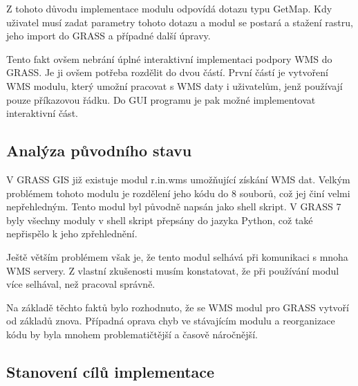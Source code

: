 \documentclass[a4paper,12pt]{article}
\begin{document}
Z tohoto důvodu implementace modulu odpovídá dotazu typu GetMap. Kdy
uživatel musí zadat parametry tohoto dotazu a modul se postará a
stažení rastru, jeho import do GRASS a případné další úpravy.


Tento fakt ovšem nebrání úplné interaktivní implementaci podpory WMS
do GRASS. Je ji ovšem potřeba rozdělit do dvou částí. První částí je
vytvoření WMS modulu, který umožní pracovat s WMS daty i uživatelům,
jenž používají pouze příkazovou řádku.  Do GUI programu je pak možné
implementovat interaktivní část.


\subsection{Analýza původního stavu}

V GRASS GIS již existuje modul r.in.wms umožňující získání WMS dat.
Velkým problémem tohoto modulu je rozdělení jeho kódu do 8 souborů,
což jej činí velmi nepřehledným.  Tento modul byl původně napsán jako
shell skript. V GRASS 7 byly všechny moduly v shell skript přepsány do
jazyka Python, což také nepřispělo k jeho zpřehlednění.

Ještě větším problémem však je, že tento modul selhává při komunikaci
s mnoha WMS servery. Z vlastní zkušenosti musím konstatovat, že při
používání modul více selhával, než pracoval správně.

Na základě těchto faktů bylo rozhodnuto, že se WMS modul pro GRASS
vytvoří od základů znova. Případná oprava chyb ve stávajícím modulu a
reorganizace kódu by byla mnohem problematičtější a časově náročnější.

\newpage

\subsection{Stanovení cílů implementace}
\end{document}
